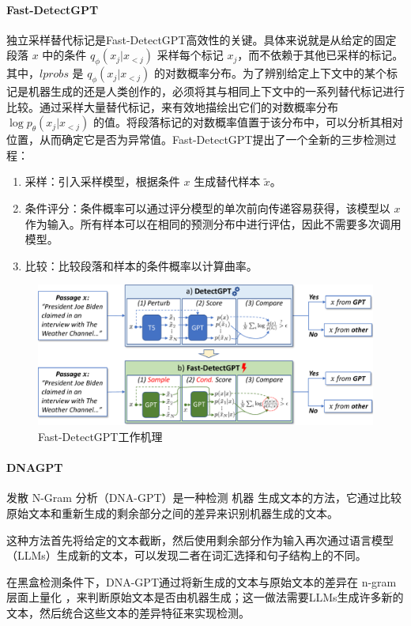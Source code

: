 \documentclass[a4paper]{report}
\begin{document}
\paragraph{Fast-DetectGPT}
独立采样替代标记是Fast-DetectGPT高效性的关键。具体来说就是从给定的固定段落 \(x\) 中的条件 \(q_{\phi}(x_j|x_{<j})\) 采样每个标记 \(x_j\)，而不依赖于其他已采样的标记。其中，\(lprobs\) 是 \(q_{\phi}(x_j|x_{<j})\) 的对数概率分布。为了辨别给定上下文中的某个标记是机器生成的还是人类创作的，必须将其与相同上下文中的一系列替代标记进行比较。通过采样大量替代标记，来有效地描绘出它们的对数概率分布 \( \log p_{\theta}(x_j | x_{<j}) \) 的值。将段落标记的对数概率值置于该分布中，可以分析其相对位置，从而确定它是否为异常值。Fast-DetectGPT提出了一个全新的三步检测过程：
\begin{enumerate}
	\item 采样：引入采样模型，根据条件 \(x\) 生成替代样本 \(\tilde{x}\)。
	\item 条件评分：条件概率可以通过评分模型的单次前向传递容易获得，该模型以 \(x\) 作为输入。所有样本可以在相同的预测分布中进行评估，因此不需要多次调用模型。
	\item 比较：比较段落和样本的条件概率以计算曲率\cite{bao2023fast}。
\end{enumerate}
\begin{figure}[H]
	\centering
	\includegraphics[width=\textwidth]{figures/FastDetectGPT.pdf}
	\caption{Fast-DetectGPT工作机理}
	\label{Fast-DetectGPT}
\end{figure}
\paragraph{DNAGPT}
发散 N-Gram 分析（DNA-GPT）是一种检测 机器 生成文本的方法，它通过比较原始文本和重新生成的剩余部分之间的差异来识别机器生成的文本。

这种方法首先将给定的文本截断，然后使用剩余部分作为输入再次通过语言模型（LLMs）生成新的文本，可以发现二者在词汇选择和句子结构上的不同。

在黑盒检测条件下，DNA-GPT通过将新生成的文本与原始文本的差异在 n-gram 层面上量化 ，来判断原始文本是否由机器生成；这一做法需要LLMs生成许多新的文本，然后统合这些文本的差异特征来实现检测。
\end{document}
